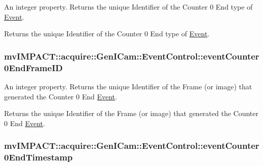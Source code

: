 An integer property. Returns the unique Identifier of the Counter 0 End type of \hyperlink{classmv_i_m_p_a_c_t_1_1acquire_1_1_event}{Event}. 

Returns the unique Identifier of the Counter 0 End type of \hyperlink{classmv_i_m_p_a_c_t_1_1acquire_1_1_event}{Event}. \hypertarget{classmv_i_m_p_a_c_t_1_1acquire_1_1_gen_i_cam_1_1_event_control_a81b67628ae7d3fe1448ba775557adad0}{
\subsubsection[{event\+Counter0\+End\+Frame\+I\+D}]{ mv\+I\+M\+P\+A\+C\+T\+::acquire\+::\+Gen\+I\+Cam\+::\+Event\+Control\+::event\+Counter0\+End\+Frame\+I\+D}}\label{classmv_i_m_p_a_c_t_1_1acquire_1_1_gen_i_cam_1_1_event_control_a81b67628ae7d3fe1448ba775557adad0}


An integer property. Returns the unique Identifier of the Frame (or image) that generated the Counter 0 End \hyperlink{classmv_i_m_p_a_c_t_1_1acquire_1_1_event}{Event}. 

Returns the unique Identifier of the Frame (or image) that generated the Counter 0 End \hyperlink{classmv_i_m_p_a_c_t_1_1acquire_1_1_event}{Event}. \hypertarget{classmv_i_m_p_a_c_t_1_1acquire_1_1_gen_i_cam_1_1_event_control_a1150012d4c6379d5fe85f3cc09cea1a5}{
\subsubsection[{event\+Counter0\+End\+Timestamp}]{ mv\+I\+M\+P\+A\+C\+T\+::acquire\+::\+Gen\+I\+Cam\+::\+Event\+Control\+::event\+Counter0\+End\+Timestamp}}\label{classmv_i_m_p_a_c_t_1_1acquire_1_1_gen_i_cam_1_1_event_control_a1150012d4c6379d5fe85f3cc09cea1a5}


